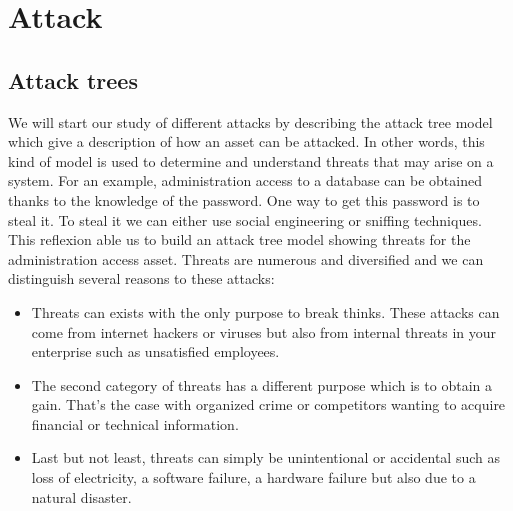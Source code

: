 \section{Attack}

\subsection{Attack trees}
We will start our study of different attacks by describing the attack tree model
which give a description of how an asset can be attacked. In other words, this
kind of model is used to determine and understand threats that may arise on a
system. For an example, administration access to a database can be obtained
thanks to the knowledge of the password. One way to get this password is to
steal it. To steal it we can either use social engineering or sniffing
techniques. This reflexion able us to build an attack tree model showing threats
for the administration access asset. Threats are numerous and diversified and we
can distinguish several reasons to these attacks: \begin{itemize}{} \item
Threats can exists with the only purpose to break thinks. These attacks can come
from internet hackers or viruses but also from internal threats in your
enterprise such as unsatisfied employees. \item The second category of threats
has a different purpose which is to obtain a gain. That's the case with
organized crime or competitors wanting to acquire financial or technical
information. \item Last but not least, threats can simply be unintentional or
accidental such as loss of electricity, a software failure, a hardware failure
but also due to a natural disaster. \end{itemize}

